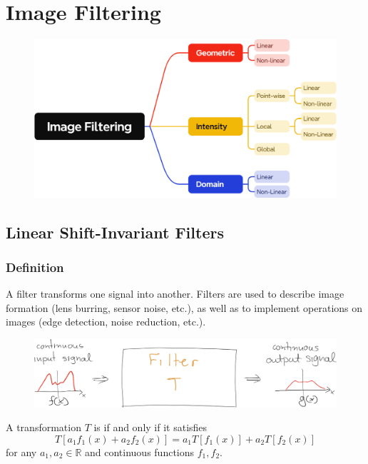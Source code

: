 \chapter{Image Filtering}
\vspace{-4em}
\begin{figure}[ht!]
    \centering
    \includegraphics[width=0.67\linewidth]{figures/Image Filtering.png}
\end{figure}
\vspace{-1em}
\section{Linear Shift-Invariant Filters}

\subsection{Definition}

A filter transforms one signal into another. Filters are used to describe image formation (lens burring, sensor noise, etc.), as well as to implement operations on images (edge detection, noise reduction, etc.).

\begin{figure}[ht!]
    \centering
    \includegraphics[width=0.75\linewidth]{figures/filter.png}
\end{figure}

\begin{definition}\label{def:linear-transformation}
    A transformation $T$ is  if and only if it satisfies \[
        T[a_1 f_1(x) + a_2 f_2(x)] = a_1 T[f_1(x)] + a_2 T[f_2(x)]
    \] for any $a_1, a_2 \in \mathbb{R}$ and continuous functions $f_1, f_2$.
\end{definition}

